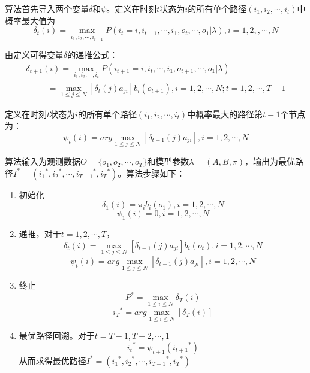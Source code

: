     算法首先导入两个变量$\delta $和$\psi $。定义在时刻$t$状态为$i$的所有单个路径$({i_1},{i_2}, \cdots ,{i_t})$中概率最大值为
        \begin{equation}
            {\delta _t}(i) = \mathop {\max }\limits_{{i_1},{i_2}, \cdots ,{i_{t - 1}}} P({i_t} = i,{i_{t - 1}}, \cdots ,{i_1},{o_t}, \cdots ,{o_1}|\lambda ),i = 1,2,, \cdots ,N
        \end{equation}

    由定义可得变量$\delta $的递推公式：
        \begin{equation}
            \begin{array}{l}
            {\delta _{t + 1}}(i) = \mathop {\max }\limits_{{i_1},{i_2}, \cdots ,{i_t}} P({i_{t + 1}} = i,{i_t}, \cdots ,{i_1},{o_{t + 1}}, \cdots ,{o_1}|\lambda )\\
            \;\;\;\;\;\;\;\;\; = \mathop {\max }\limits_{1 \le j \le N} \left[ {{\delta _t}(j){a_{ji}}} \right]{b_i}({o_{t + 1}}),i = 1,2, \cdots ,N;t = 1,2, \cdots,T - 1
        \end{array}
        \end{equation}

    定义在时刻$t$状态为$i$的所有单个路径$({i_1},{i_2}, \cdots ,{i_t})$中概率最大的路径第$t-1$个节点为：
         \begin{equation}
            {\psi _t}(i) = arg\mathop {\max }\limits_{1 \le j \le N} [{\delta _{t - 1}}(j){a_{ji}}],i = 1,2, \cdots, N
        \end{equation}

    \begin{algorithm}[Viterbi算法]算法输入为观测数据$O = \{ {o_1},{o_2}, \cdots ,{o_T}\}$和模型参数$\lambda  = \left( {A,B,\pi } \right)$，输出为最优路径${I^*} = ({i_1}^*,{i_2}^*, \cdots ,{i_{T - 1}}^*,{i_T}^*)$。算法步骤如下：
        \begin{enumerate}
                \item 初始化
                    \[{\delta _1}(i) = {\pi _i}{b_i}({o_1}),i = 1,2, \cdots ,N\]
                    \[{\psi _1}(i) = 0,i = 1,2, \cdots ,N\]
                \item 递推，对于$t = 1,2, \cdots,T$，
                    \[{\delta _t}(i) = \mathop {\max }\limits_{1 \le j \le N} \left[ {{\delta _{t - 1}}(j){a_{ji}}} \right]{b_i}({o_t}),i = 1,2, \cdots ,N\]
                    \[{\psi _t}(i) = arg\mathop {\max }\limits_{1 \le j \le N} [{\delta _{t - 1}}(j){a_{ji}}],i = 1,2, \cdots ,N\]
                \item 终止
                    \[{P^*} = \mathop {\max }\limits_{1 \le i \le N} {\delta _T}(i)\]
                    \[{i_T}^* = arg\mathop {\max }\limits_{1 \le i \le N} \left[ {{\delta _T}(i)} \right]\]
                \item 最优路径回溯。对于$t = T-1,T-2, \cdots,1$
                    \[{i_t}^* = {\psi _{t + 1}}({i_{t + 1}}^*)\]
                    从而求得最优路径${I^*} = ({i_1}^*,{i_2}^*, \cdots ,{i_{T - 1}}^*,{i_T}^*)$
        \end{enumerate}
    \end{algorithm}


